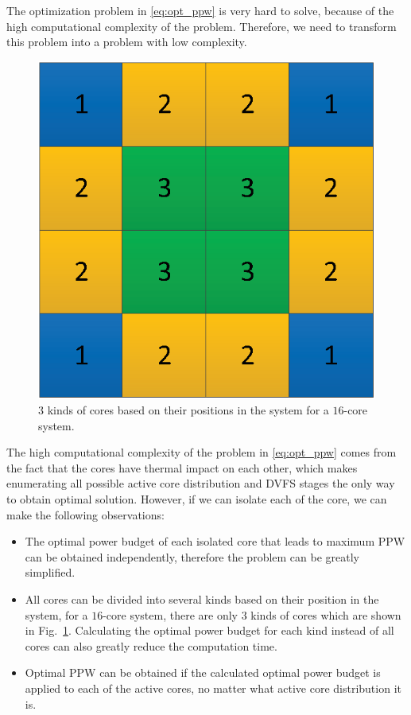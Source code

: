 The optimization problem in \eqref{eq:opt_ppw} is very hard to solve, because of the high computational complexity of the problem. Therefore, we need to transform this problem into a problem with low complexity.

\begin{figure}
\centering
\includegraphics[width=0.46\linewidth]{fig/unique_position.eps}
\caption{$3$ kinds of cores based on their positions in the system for a $16$-core system.}
\label{fig:unique_position}
\end{figure}

The high computational complexity of the problem in \eqref{eq:opt_ppw} comes from the fact that the cores have thermal impact on each other, which makes enumerating all possible active core distribution and DVFS stages the only way to obtain optimal solution. However, if we can isolate each of the core, we can make the following observations:
\begin{itemize}
\item The optimal power budget of each isolated core that leads to maximum PPW can be obtained independently, therefore the problem can be greatly simplified.
\item All cores can be divided into several kinds based on their position in the system, for a $16$-core system, there are only $3$ kinds of cores which are shown in Fig.~\ref{fig:unique_position}. Calculating the optimal power budget for each kind instead of all cores can also greatly reduce the computation time.
\item Optimal PPW can be obtained if the calculated optimal power budget is applied to each of the active cores, no matter what active core distribution it is. 
\end{itemize}


